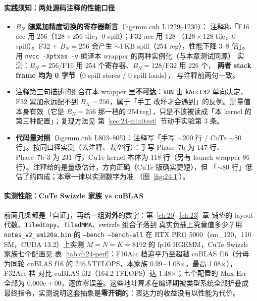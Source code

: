 \paragraph{实践须知：两处源码注释的性能口径}\label{sec:24-kaogu}

\begin{itemize}
  \item \textbf{$B_N$ 随累加精度切换的寄存器断言}（hgemm.cuh L1229--1230）：
        注释称「F16 acc 用 256（$128\times256$ tile，0 spill）；F32 acc 用 128
        （$128\times128$ tile，0 spill）。F32 $+$ $B_N{=}256$ 会产生
        $\sim$1\,KB spill（254 reg），性能下降 3--8 倍」。用
        \texttt{nvcc -Xptxas -v} 编译本 wrapper 的两种实例化（与本章测试同源）
        实测：$B_N{=}256$/F16 用 254 个寄存器、$B_N{=}128$/F32 用 226 个，
        \textbf{两者 stack frame 均为 0 字节}（0 spill stores / 0 spill loads），
        与注释前两句一致。
  \item 注释第三句描述的组合在本 wrapper 里\textbf{不可达}：\texttt{kBN} 由
        \texttt{kAccF32} 单向决定，F32 累加永远配不到 $B_N=256$，属于「手工
        改坏才会遇到」的反例。测量值本身有效（它是 $B_N{=}256$ 那一档的
        254\,reg），只是不该被读成「本 kernel 的第三种配置」；复现方法见
        第~\ref{sec:24-minitest}~节动手实验第 3 条。
  \item \textbf{代码量对照}（hgemm.cuh L803--805）：注释写「手写 $\sim$200 行 /
        CuTe $\sim$80 行」。按同口径实测（去注释、去空行）：手写 Phase~7b 为
        147 行、Phase~7b-3 为 231 行，CuTe kernel 本体为 118 行（另有 launch
        wrapper 86 行）。注释给的是量级估计，方向正确（CuTe 版确实更短），但
        「$\sim$80 行」低估了约四成；本章一律以实测数字为准
        （图~\ref{fig:24-1}）。
\end{itemize}

\paragraph{实测性能：CuTe Swizzle 家族 vs cuBLAS}\label{sec:ch24-perf}

前面几条都是「自证」，再给一组\textbf{对外}的数字：第~\ref{ch:20}--\ref{ch:23}~章
铺垫的 layout 代数、\texttt{TiledCopy}、\texttt{TiledMMA}、swizzle 组合子落到
真实负载上究竟值多少？用 \texttt{notes\_\allowbreak{}v2\_\allowbreak{}sm120a.\allowbreak{}bin} 的
\texttt{--bench --bench-all} 在 RTX PRO 5000（sm\_120，110 SM，CUDA 13.2）上实测
$M{=}N{=}K{=}8192$ 的 fp16 HGEMM，CuTe Swizzle 家族七个配置见
表~\ref{tab:ch24-perf}：F16Acc 档追平乃至超越 cuBLAS f16（分母为同轮 cuBLAS
f16 的 246.5\,TFLOPS，本家族 0.99$\sim$1.08$\times$，最高 1.08$\times$），F32Acc 档
对比 cuBLAS f32（164.2\,TFLOPS）达 1.48$\times$；七个配置的 Max Err 全部为
$0.000\mathrm{e}{+}00$，逐位零误差。这些地址算术在编译期被类型系统全部折叠成
最终指令，实测说明这套抽象是\textbf{零开销}的：表达力的收益没有以性能为代价。

